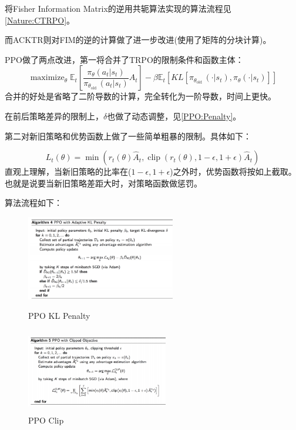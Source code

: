 \documentclass[UTF8]{ctexart}
\begin{document}
将Fisher Information Matrix的逆用共轭算法实现的算法流程见\ref{Nature:CTRPO}。

而ACKTR则对FIM的逆的计算做了进一步改进(使用了矩阵的分块计算)。


PPO做了两点改进，第一将合并了TRPO的限制条件和函数主体：
$$\operatorname{maximize}_{\theta} \mathbb{E}_{t}\left[\frac{\pi_{\theta}\left(a_{t} | 
s_{t}\right)}{\pi_{\theta_{\text {old }}}\left(a_{t} | s_{t}\right)} A_{t}\right]-\beta
 \mathbb{E}_{t}\left[K L\left[\pi_{\theta_{\text {old }}}\left(\cdot | s_{t}\right),
  \pi_{\theta}\left(\cdot | s_{t}\right)\right]\right]$$
合并的好处是省略了二阶导数的计算，完全转化为一阶导数，时间上更快。

在前后策略差异的限制上，$\delta$也做了动态调整，见\ref{PPO:Penalty}。

第二对新旧策略和优势函数上做了一些简单粗暴的限制。具体如下：

$$L_{t}(\theta)=\min \left(r_{t}(\theta) \hat{A}_{t}, \operatorname{clip}\left(r_{t}(\theta), 1-\epsilon, 1+\epsilon\right) \hat{A}_{t}\right)$$
直观上理解，当新旧策略的比率在($1-\epsilon, 1+\epsilon$)之外时，优势函数将按如上截取。
也就是说要当新旧策略差距大时，对策略函数做惩罚。

算法流程如下：

\begin{figure}[htbp]
	\centering
	\begin{minipage}[t]{0.48\textwidth}
	\centering
    \includegraphics[width=6.5cm, height=3.7cm]{./pic/PPO_KL.png}
    \caption{PPO KL Penalty}
    \label{PPO:Penalty}
	\end{minipage}
	\begin{minipage}[t]{0.48\textwidth}
		\centering
        \includegraphics[width=6.2cm, height=3.7cm]{./pic/PPO_Clip.png}
        \caption{PPO Clip}
        \label{PPO:Clip}
	\end{minipage}
\end{figure}
\end{document}
